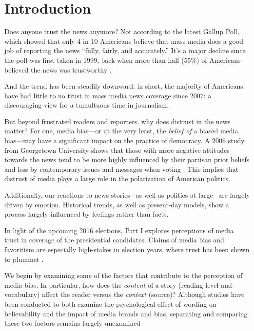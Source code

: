 
\chapter{Introduction} 

Does anyone trust the news anymore? Not according to the latest Gallup Poll, which showed that only 4 in 10 Americans believe that mass media does a good job of reporting the news ``fully, fairly, and accurately.'' It's a major decline since the poll was first taken in 1999, back when more than half (55\%) of Americans believed the news was trustworthy \cite{Gallup-trust-2015}.

And the trend has been steadily downward: in short, the majority of Americans have had little to no trust in mass media news coverage since 2007: a discouraging view for a tumultuous time in journalism.

But beyond frustrated readers and reporters, why does distrust in the news matter? For one, media bias---or at the very least, the \emph{belief of} a biased media bias---may have a significant impact on the practice of democracy. A 2006 study from Georgetown University shows that those with more negative attitudes towards the news tend to be more highly influenced by their partisan prior beliefs and less by contemporary issues and messages when voting \cite{ladd2005attitudes}. This implies that distrust of media plays a large role in the polarization of American politics.

Additionally, our reactions to news stories-- as well as politics at large-- are largely driven by emotion. Historical trends, as well as present-day models, show a process largely influenced by feelings rather than facts.


In light of the upcoming 2016 elections, Part I explores perceptions of media trust in coverage of the presidential candidates. Claims of media bias and favoritism are especially high-stakes in election years, where trust has been shown to plummet \cite{Gallup-trust-2015}.  

We begin by examining some of the factors that contribute to the perception of media bias. In particular, how does the \emph{content} of a story (reading level and vocabulary) affect the reader versus the \emph{context} (source)? Although studies have been conducted to both examine the psychological effect of wording on believability and the impact of media brands and bias, separating and comparing these two factors remains largely unexamined \cite{weisberg2008seductive, baum2008eye}

